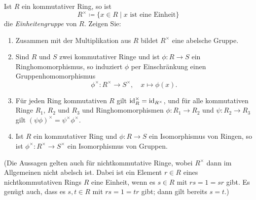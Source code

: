 \begin{question}[subtitle = Die Einheitengruppe]
  Ist $R$ ein kommutativer Ring, so ist
  \[
              R^\times
    \coloneqq \{x \in R \mid \text{$x$ ist eine Einheit}\}
  \]
  die \emph{Einheitengruppe} von $R$.
  Zeigen Sie:
  \begin{enumerate}
    \item
      Zusammen mit der Multiplikation aus $R$ bildet $R^\times$ eine abelsche Gruppe.
    \item
      Sind $R$ und $S$ zwei kommutativer Ringe und ist $\phi \colon R \to S$ ein Ringhomomorphismus, so induziert $\phi$ per Einschränkung einen Gruppenhomomorphismus
      \[
        \phi^\times \colon R^\times \to S^\times,
        \quad
        x \mapsto \phi(x).
      \]
    \item
      Für jeden Ring kommutativen $R$ gilt $\operatorname{id}_R^\times = \operatorname{id}_{R^\times}$, und für alle kommutativen Ringe $R_1$, $R_2$ und $R_3$ und Ringhomomorphismen $\phi \colon R_1 \to R_2$ und $\psi \colon R_2 \to R_3$ gilt $(\psi \phi)^\times = \psi^\times \phi^\times$.
    \item
      Ist $R$ ein kommutativer Ring und $\phi \colon R \to S$ ein Isomorphismus von Ringen, so ist $\phi^\times \colon R^\times \to S^\times$ ein Isomorphismus von Gruppen.
  \end{enumerate}
  (Die Aussagen gelten auch für nichtkommutative Ringe, wobei $R^\times$ dann im Allgemeinen nicht abelsch ist.
   Dabei ist ein Element $r \in R$ eines nichtkommutativen Rings $R$ eine Einheit, wenn es $s \in R$ mit $rs = 1 = sr$ gibt.
   Es genügt auch, dass es $s, t \in R$ mit $rs = 1 = tr$ gibt; dann gilt bereits $s = t$.)
\end{question}


